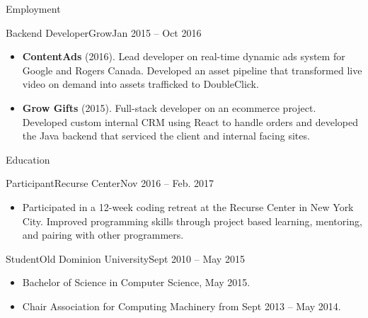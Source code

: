 \documentclass[]{mcdowellcv}
\begin{document}
\begin{cvsection}{Employment}
        \begin{cvsubsection}{Backend Developer}{Grow}{Jan 2015 – Oct 2016}
            \begin{itemize}
                \item \textbf{ContentAds} (2016). Lead developer on real-time dynamic ads system for Google and Rogers Canada. \newline 
                Developed an asset pipeline that transformed live video on demand into assets trafficked to DoubleClick.
            \end{itemize}
            \begin{itemize}
                \item \textbf{Grow Gifts} (2015). Full-stack developer on an ecommerce project. Developed custom internal CRM using React to handle orders and developed the Java backend that serviced the client and internal facing sites.
            \end{itemize}
        \end{cvsubsection}
    \end{cvsection}

    \begin{cvsection}{Education}
        \begin{cvsubsection}{Participant}{Recurse Center}{Nov 2016 – Feb. 2017}
            \begin{itemize}
                \item Participated in a 12-week coding retreat at the Recurse Center in New York City.\newline 
                Improved programming skills through project based learning, mentoring, and pairing with other programmers.
            \end{itemize}
        \end{cvsubsection}
        \begin{cvsubsection}{Student}{Old Dominion University}{Sept 2010 – May 2015}
            \begin{itemize}
                \item Bachelor of Science in Computer Science, May 2015.
                \item Chair Association for Computing Machinery from Sept 2013 – May 2014.
            \end{itemize}
        \end{cvsubsection}
    \end{cvsection}
\end{document}

